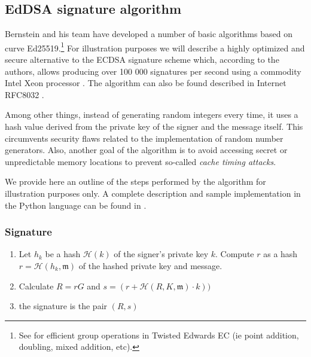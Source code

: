 \subsection{EdDSA signature algorithm}
\label{EdDSA_section}

Bernstein and his team have developed a number of basic algorithms based on curve Ed25519.\footnote{\label{group_ops_twisted_edwards_note}See \cite{cryptoeprint:2007:286} for efficient group operations in Twisted Edwards EC (ie point addition, doubling, mixed addition, etc).}
For illustration purposes we will describe a highly optimized and secure alternative to the ECDSA signature scheme which, according to the authors, allows producing over 100 000 signatures per second using a commodity Intel Xeon processor \cite{Bernstein2012}. The algorithm can also be found described in Internet RFC8032 \cite{rfc8032}.

Among other things, instead of generating random integers every time, it uses a hash value derived from the private key of the signer and the message itself. This circumvents security flaws related to the implementation of random number generators. Also, another goal of the algorithm is to avoid accessing secret or unpredictable memory locations to prevent so-called {\em cache timing attacks}.

We provide here an outline of the steps performed by the algorithm for illustration purposes only. A complete description and sample implementation in the Python language can be found in \cite{rfc8032}. 

\newpage
\subsubsection{Signature}

\begin{enumerate}
	
	\item Let \(h_k\) be a hash \(\mathcal{H}(k)\) of the signer's private key \(k\). 
	Compute \(r\) as a hash \(r = \mathcal{H}(h_k,  \mathfrak{m})\)  of the hashed private key and message.
	
	\item Calculate \(R = r G\) and \(s = (r + \mathcal{H}(R, K,  \mathfrak{m}) \cdot k)) \)
	
	\item the signature is the pair \((R, s)\)
	
	
\end{enumerate}



